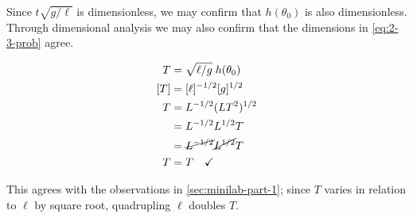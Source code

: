 \documentclass[12pt]{article}
\begin{document}
  Since $t\sqrt{g/\ell}$ is dimensionless, we may confirm that $h(\theta_0)$ is
  also dimensionless. Through dimensional analysis we may also confirm that the
  dimensions in \cref{eq:2-3-prob} agree.

  \begin{equation}
    \begin{aligned}
      T &= \sqrt{\ell/g}\;h(\theta_0) \\
      [T] &= [\ell]^{-1/2}[g]^{1/2} \\
      T &= L^{-1/2}(LT^2)^{1/2} \\
      &= L^{-1/2}L^{1/2}T \\
      &= \cancel{L^{-1/2}}\cancel{L^{1/2}}T \\
      T &= T \quad\checkmark
    \end{aligned}
  \end{equation}

  This agrees with the observations in \cref{sec:minilab-part-1}; since $T$
  varies in relation to $\ell$ by square root, quadrupling $\ell$ doubles $T$.
\end{document}
